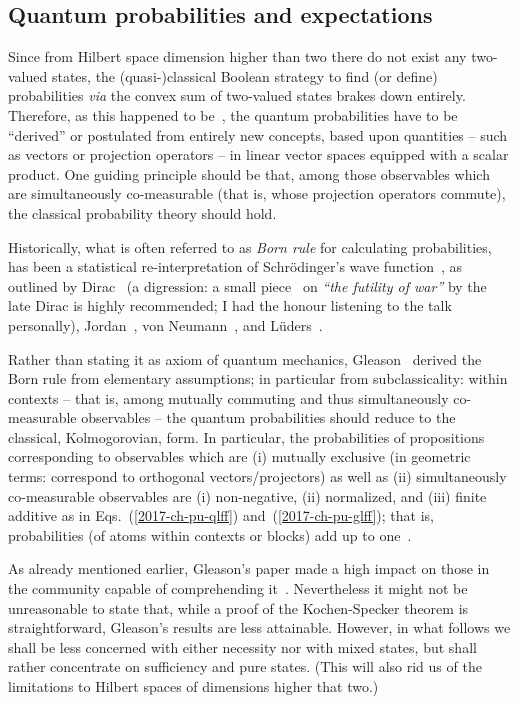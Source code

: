 \subsection{Quantum probabilities and expectations}

Since from Hilbert space dimension higher than two there do not exist any two-valued states,
the (quasi-)classical Boolean strategy to find (or define) probabilities {\it via}
the convex sum of two-valued states brakes down entirely.
Therefore, as this happened to be~\cite{Dirac621,dirac,Jordan1927,vonNeumann:1927:WAQ,v-neumann-49,v-neumann-55},
the quantum probabilities have to be ``derived'' or postulated from
entirely new concepts, based upon quantities -- such as vectors or projection operators --
in linear vector spaces equipped with a scalar product.
One guiding principle should be that, among those observables which are simultaneously co-measurable (that is, whose
projection operators commute), the classical probability theory should hold.

Historically, what is often referred to as
{\em Born rule}
for calculating probabilities,
has been a statistical re-interpretation of Schr\"odinger's
wave function~\cite[Footnote 1, Anmerkung bei der Korrektur, p.~865]{born-26-1},
as outlined by Dirac~\cite{Dirac621,dirac}
(a digression: a small piece~\cite{dirac-81} on {\em ``the futility of war''}
by the late Dirac is highly recommended; I had the honour listening to the talk personally), Jordan~\cite{Jordan1927},
von Neumann~\cite{vonNeumann:1927:WAQ,v-neumann-49,v-neumann-55}, and
L\"uders~\cite{Luders-1950,Luders-1950e,Busch2009}.

Rather than stating it as axiom of quantum mechanics,
Gleason~\cite{Gleason}
derived the Born rule from elementary assumptions; in particular from subclassicality: within contexts -- that is,
among mutually commuting and thus simultaneously co-measurable observables -- the
quantum probabilities should reduce to the classical, Kolmogorovian, form.
In particular, the probabilities of propositions corresponding to observables which are (i) mutually exclusive
(in geometric terms: correspond to orthogonal vectors/projectors)
as well as (ii) simultaneously co-measurable observables
are (i) non-negative, (ii) normalized, and (iii) finite additive as in
Eqs.~(\ref{2017-ch-pu-qlff}) and~(\ref{2017-ch-pu-glff}); that is, probabilities
(of atoms within contexts or blocks)
add up to one~\cite[Section~1]{sep-probability-interpret}.

As already mentioned earlier, Gleason's paper made a high impact on those in the community capable
of comprehending it~\cite{ZirlSchl-65,kamber65,bell-66,kochen1,c-k-m,r:dvur-93,pitowsky:218,rich-bridge}.
Nevertheless it might not be unreasonable to state that, while a proof of the Kochen-Specker theorem is straightforward,
Gleason's results are less attainable.
However, in what follows we shall be less concerned with either necessity nor with mixed states,
but shall rather concentrate on sufficiency and pure states.
(This will also rid us of the limitations to Hilbert spaces of dimensions higher that two.)

